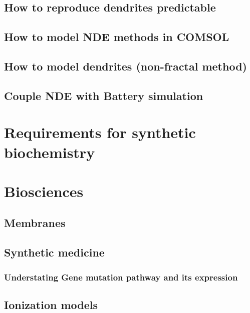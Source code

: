 \documentclass[12pt]{book}
\begin{document}
\subsection{How to reproduce dendrites predictable}
\subsection{How to model NDE methods in COMSOL}
\subsection{How to model dendrites (non-fractal method)}
\subsection{Couple NDE with Battery simulation}

\section{Requirements for synthetic biochemistry}
\section{Biosciences}
\subsection{Membranes}
\subsection{Synthetic medicine}
\subsubsection{Understating Gene mutation pathway and its expression}


\subsection{Ionization models}

\newpage


\end{document}
